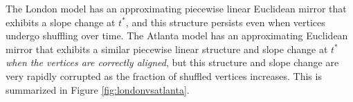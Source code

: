 \documentclass[12pt]{article}
\newcommand{\RR}{\mathbb{R}}
\theoremstyle{definition}
\newcommand{\bA}{\mathbf{A}}
\begin{document}
The London model has an approximating piecewise linear Euclidean mirror that exhibits a slope change at $t^*$, and this structure persists even when vertices undergo shuffling over time. The Atlanta model has an approximating Euclidean mirror that exhibits a similar piecewise linear structure and slope change at $t^*$ {\em when the vertices are correctly aligned}, but this structure and slope change are very rapidly corrupted as the fraction of shuffled vertices increases. This is summarized in Figure \ref{fig:londonvsatlanta}.





\end{document}
